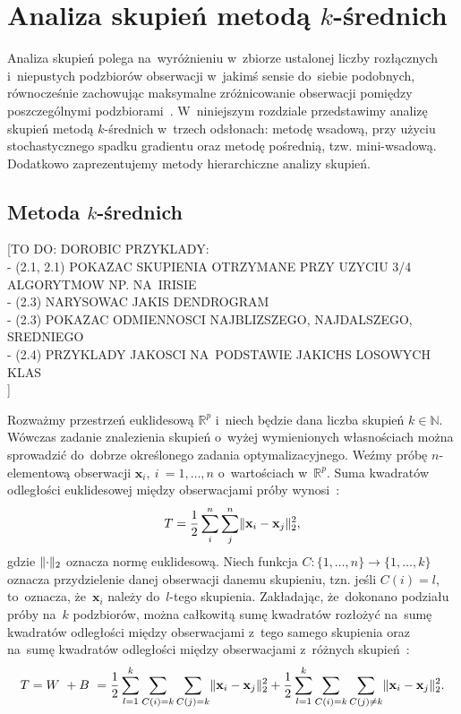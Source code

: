 \documentclass{praca1}
\DeclarePairedDelimiter{\norm}{\lVert}{\rVert}
\begin{document}
\chapter{Analiza skupień metodą $k$-średnich}
\label{analiza-skupien}

Analiza skupień polega na~wyróżnieniu w~zbiorze ustalonej liczby rozłącznych i~niepustych podzbiorów obserwacji w~jakimś sensie do~siebie podobnych, równocześnie zachowując maksymalne zróżnicowanie obserwacji pomiędzy poszczególnymi podzbiorami~\cite{Koronacki2005:statystyczne}. W~niniejszym rozdziale przedstawimy analizę skupień metodą $k$-średnich w~trzech odsłonach: metodę wsadową, przy użyciu stochastycznego spadku gradientu oraz metodę pośrednią, tzw. mini-wsadową. Dodatkowo zaprezentujemy metody hierarchiczne analizy skupień.

\section{Metoda $k$-średnich}

[TO DO: DOROBIC PRZYKLADY:\\
- (2.1, 2.1) POKAZAC SKUPIENIA OTRZYMANE PRZY UZYCIU 3/4 ALGORYTMOW NP. NA~IRISIE\\
- (2.3) NARYSOWAC JAKIS DENDROGRAM\\
- (2.3) POKAZAC ODMIENNOSCI NAJBLIZSZEGO, NAJDALSZEGO, SREDNIEGO\\
- (2.4) PRZYKLADY JAKOSCI NA~PODSTAWIE JAKICHS LOSOWYCH KLAS\\]

Rozważmy przestrzeń euklidesową $\mathbb{R}^p$ i~niech będzie dana liczba skupień $k\in \mathbb{N}$. Wówczas zadanie znalezienia skupień o~wyżej wymienionych własnościach można sprowadzić do~dobrze określonego zadania optymalizacyjnego. Weźmy próbę $n$-elementową obserwacji $\mathbf{x}_i,\ i~= 1,\ldots,n$ o~wartościach w~$\mathbb{R}^p$. %
Suma kwadratów odległości euklidesowej między obserwacjami próby wynosi~\cite{Koronacki2005:statystyczne}:
\begin{equation}
T = \frac{1}{2}\sum\limits_{i}^{n}\sum\limits_{j}^{n} \norm{\mathbf{x}_i - \mathbf{x}_j}_2^2,
\end{equation}
gdzie $\norm{\cdot}_2$ oznacza normę euklidesową. Niech funkcja $C:\{1,\ldots,n\} \rightarrow \{1,\ldots, k\}$ oznacza przydzielenie danej obserwacji danemu skupieniu, tzn. jeśli $C(i) = l$, to~oznacza, że~$\mathbf{x}_i$ należy do~$l$-tego skupienia. Zakładając, że~dokonano podziału próby na~$k$ podzbiorów, można całkowitą sumę kwadratów rozłożyć na~sumę kwadratów odległości między obserwacjami z~tego samego skupienia oraz na~sumę kwadratów odległości między obserwacjami z~różnych skupień~\cite{Koronacki2005:statystyczne}:
\begin{equation}
T = W~+ B~= \frac{1}{2}\sum\limits_{l=1}^{k}\sum\limits_{C(i) = k}\sum\limits_{C(j) = k} \norm{\mathbf{x}_i - \mathbf{x}_j}_2^2 + \frac{1}{2}\sum\limits_{l=1}^{k}\sum\limits_{C(i) = k}\sum\limits_{C(j) \neq k} \norm{\mathbf{x}_i - \mathbf{x}_j}_2^2.
\end{equation}
\end{document}
